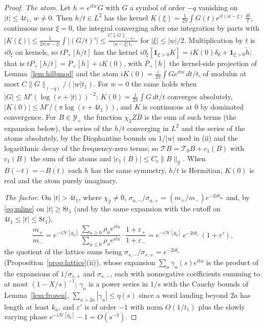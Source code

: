 \documentclass[11pt]{article}
\theoremstyle{definition}
\theoremstyle{remark}
\begin{document}
\begin{proof}
\emph{The atom.} Let $h=e^{itw}G$ with $G$ a symbol of order $-q$ vanishing on $|t|\le4t_1$, $w\ne0$. Then $h/t\in L^2$ has the kernel $K(\xi)=\frac1{2\pi}\int G(t)e^{it(w-\xi)}\,\frac{dt}t$, continuous near $\xi=0$, the integral converging after one integration by parts with $|K(\xi)|\le\frac1{2\pi|w-\xi|}\int|(G/t)'|\le\frac{C\|G\|_{(-q)}}{|w-\xi|\,t_1}$ for $|\xi|\le|w|/2$. Multiplication by $t$ is $i\partial_\xi$ on kernels, so $tP_+[h/t]$ has the kernel $i\partial_\xi[\mathbf 1_{\xi>0}K]=iK(0)\delta_0+\mathbf 1_{\xi>0}\check h$: that is $tP_+[h/t]=P_+[h]+iK(0)$, with $P_+[h]$ the kernel-side projection of Lemma~\ref{lem:hilbmod} and the atom $iK(0)=\frac i{2\pi}\int Ge^{itw}\,dt/t$, of modulus at most $C\|G\|_{(-q)}/(|w|t_1)$. For $w=0$ the same holds when $|G|\le M'(\log(e+|t|))^{-2}$: $K(0)=\frac1{2\pi}\int G\,dt/t$ converges absolutely, $|K(0)|\le M'/(\pi\log(e+4t_1))$, and $K$ is continuous at $0$ by dominated convergence. For $B\in\mathcal Y_+$ the function $\chi_2Z\overline B$ is the sum of such terms (the expansion below), the series of the $h/t$ converging in $L^2$ and the series of the atoms absolutely, by the Diophantine bounds on $1/|w|$ used in (ii) and the logarithmic decay of the frequency-zero terms; so $\mathcal TB=\mathcal T_0B+c_1(B)$ with $c_1(B)$ the sum of the atoms and $|c_1(B)|\le C_c\|B\|_{\mathcal Y}$. When $B(-t)=-\overline{B(t)}$ each $h$ has the same symmetry, $h/t$ is Hermitian, $K(0)$ is real and the atom purely imaginary.

\emph{The factor.} On $|t|>4t_1$, where $\chi_2\ne0$, $\sigma_{a,-}/\sigma_{a,+}=(m_+/m_-)e^{-2i\theta_\infty}$ and, by \eqref{eq:mline} on $|t|\ge8t_1$ (and by the same expansion with the cutoff on $4t_1\le|t|\le8t_1$),
\[
\frac{m_+}{m_-}=e^{-i\mathcal H[g_0]}\,\frac{\sum_{u\ge0}\rho_ue^{itu}}{\sum_{u\le0}\rho_ue^{itu}}\cdot\frac{1+\varepsilon_+}{1+\varepsilon_-}=e^{-i\mathcal H[g_0]}\,e^{-2i\theta_s}\,(1+\varepsilon'),
\]
the quotient of the lattice sums being $\sigma_{s,-}/\sigma_{s,+}=e^{-2i\theta_s}$ (Proposition~\ref{prop:lattice}(ii)), whose expansion $\sum_u\gamma_u(s)e^{itu}$ is the product of the expansions of $1/\sigma_{s,+}$ and $\sigma_{s,-}$, each with nonnegative coefficients summing to at most $(1-X/s)^{-1}$; $\gamma_u$ is a power series in $1/s$ with the Cauchy bounds of Lemma~\ref{lem:frozen}, $\sum_{u>2a}|\gamma_u|\le\eta(s)$ since a word landing beyond $2a$ has length at least $k_a$, and $\varepsilon'$ is of order $-1$ with norm $O(1/t_1)$ plus the slowly varying phase $e^{-i\mathcal H[g_0]}-1=O(s^{-3})$.


\end{proof}
\end{document}
